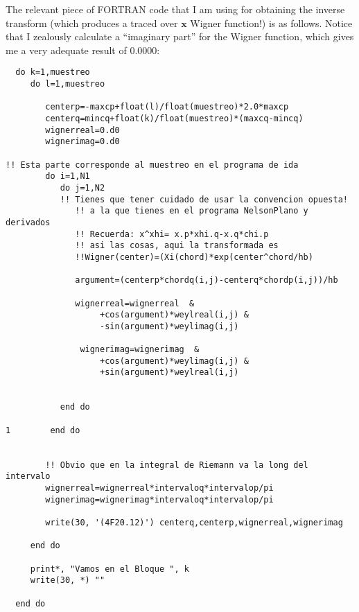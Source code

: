 \documentclass[a4paper,12pt]{article}
\newcommand{\xfase}{\mathbf{x}}
\begin{document}
The relevant piece of FORTRAN code that I am using for obtaining the inverse transform 
(which produces a traced over $\xfase$ Wigner function!) is as follows. Notice that
I zealously calculate a ``imaginary part'' for the Wigner function, which
gives me a very adequate result of $0.0000$:

\begin{verbatim}
  do k=1,muestreo
     do l=1,muestreo

        centerp=-maxcp+float(l)/float(muestreo)*2.0*maxcp
        centerq=mincq+float(k)/float(muestreo)*(maxcq-mincq)
        wignerreal=0.d0
        wignerimag=0.d0

!! Esta parte corresponde al muestreo en el programa de ida
        do i=1,N1
           do j=1,N2
           !! Tienes que tener cuidado de usar la convencion opuesta!
              !! a la que tienes en el programa NelsonPlano y derivados
              !! Recuerda: x^xhi= x.p*xhi.q-x.q*chi.p
              !! asi las cosas, aqui la transformada es 
              !!Wigner(center)=(Xi(chord)*exp(center^chord/hb)

              argument=(centerp*chordq(i,j)-centerq*chordp(i,j))/hb 
                           
              wignerreal=wignerreal  &
                   +cos(argument)*weylreal(i,j) &
                   -sin(argument)*weylimag(i,j)
              
               wignerimag=wignerimag  &
                   +cos(argument)*weylimag(i,j) &
                   +sin(argument)*weylreal(i,j)

              
           end do
           
1        end do
        

        !! Obvio que en la integral de Riemann va la long del intervalo
        wignerreal=wignerreal*intervaloq*intervalop/pi
        wignerimag=wignerimag*intervaloq*intervalop/pi
 
        write(30, '(4F20.12)') centerq,centerp,wignerreal,wignerimag
        
     end do
     
     print*, "Vamos en el Bloque ", k
     write(30, *) ""

  end do

\end{verbatim}
  
\end{document}
